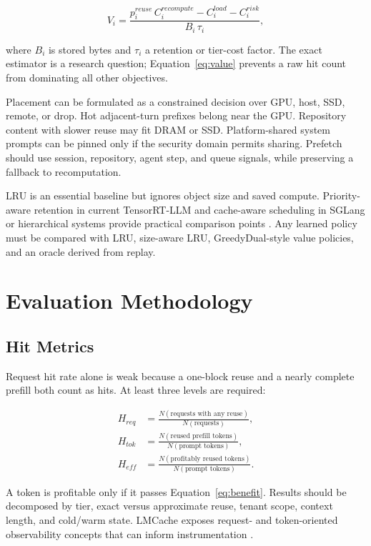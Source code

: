 \documentclass[conference,10pt]{IEEEtran}
\begin{document}
\begin{equation}
V_i = \frac{p_i^{reuse}\,C_i^{recompute}-C_i^{load}-C_i^{risk}}
{B_i\,\tau_i},
\label{eq:value}
\end{equation}

where $B_i$ is stored bytes and $\tau_i$ a retention or tier-cost factor. The exact estimator is a research question; Equation~\ref{eq:value} prevents a raw hit count from dominating all other objectives.

Placement can be formulated as a constrained decision over GPU, host, SSD, remote, or drop. Hot adjacent-turn prefixes belong near the GPU. Repository content with slower reuse may fit DRAM or SSD. Platform-shared system prompts can be pinned only if the security domain permits sharing. Prefetch should use session, repository, agent step, and queue signals, while preserving a fallback to recomputation.

LRU is an essential baseline but ignores object size and saved compute. Priority-aware retention in current TensorRT-LLM and cache-aware scheduling in SGLang or hierarchical systems provide practical comparison points \cite{d07nvidia,d03sglangproject}. Any learned policy must be compared with LRU, size-aware LRU, GreedyDual-style value policies, and an oracle derived from replay.

\section{Evaluation Methodology}

\subsection{Hit Metrics}

Request hit rate alone is weak because a one-block reuse and a nearly complete prefill both count as hits. At least three levels are required:

\begin{align}
H_{req} &= \frac{N(\text{requests with any reuse})}{N(\text{requests})}, \\
H_{tok} &= \frac{N(\text{reused prefill tokens})}{N(\text{prompt tokens})}, \\
H_{eff} &= \frac{N(\text{profitably reused tokens})}{N(\text{prompt tokens})}.
\label{eq:hits}
\end{align}

A token is profitable only if it passes Equation~\ref{eq:benefit}. Results should be decomposed by tier, exact versus approximate reuse, tenant scope, context length, and cold/warm state. LMCache exposes request- and token-oriented observability concepts that can inform instrumentation \cite{d06lmcacheproject}.
\end{document}
